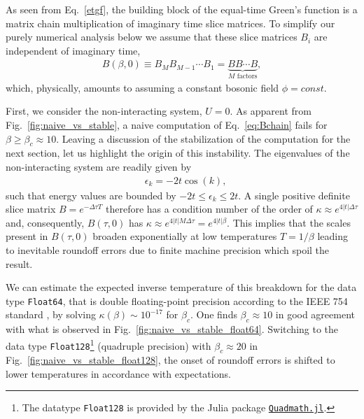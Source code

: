\documentclass[submission, Phys]{SciPost}
\begin{document}
As seen from Eq.~\eqref{etgf}, the building block of the equal-time Green's function is a matrix chain multiplication of imaginary time slice matrices. To simplify our purely numerical analysis below we assume that these slice matrices $B_i$ are independent of imaginary time,
\begin{align}
	B(\beta, 0) \equiv B_M B_{M-1} \cdots B_1 = \underbrace{B B \cdots B}_{M \textrm{ factors}}, \label{eq:Bchain}
\end{align}
which, physically, amounts to assuming a constant bosonic field $\phi = \textit{const}$.

First, we consider the non-interacting system, $U=0$. As apparent from Fig.~\ref{fig:naive_vs_stable}, a naive computation of Eq.~\ref{eq:Bchain} fails for $\beta \geq \beta_c \approx 10$. Leaving a discussion of the stabilization of the computation for the next section, let us highlight the origin of this instability. The eigenvalues of the non-interacting system are readily given by
\begin{align}
	&\epsilon_k = -2t\cos(k),
\end{align}
such that energy values are bounded by $-2t \leq \epsilon_k \leq 2t$. A single positive definite slice matrix $B = e^{-\Delta \tau T}$ therefore has a condition number of the order of $\kappa \approx e^{4|t|\Delta \tau}$ and, consequently, $B(\tau, 0)$ has $\kappa \approx e^{4|t|M\Delta \tau} = e^{4|t|\beta}$. This implies that the scales present in $B(\tau, 0)$ broaden exponentially at low temperatures $T=1/\beta$ leading to inevitable roundoff errors due to finite machine precision which spoil the result.

We can estimate the expected inverse temperature of this breakdown for the data type \texttt{Float64}, that is double floating-point precision according to the IEEE 754 standard \cite{Goldberg1991}, by solving $\kappa(\beta) \sim 10^{-17}$ for $\beta_c$. One finds $\beta_c \approx 10$ in good agreement with what is observed in Fig.~\ref{fig:naive_vs_stable_float64}. Switching to the data type \texttt{Float128}\footnote{The datatype \texttt{Float128} is provided by the Julia package \href{https://github.com/JuliaMath/Quadmath.jl}{\texttt{Quadmath.jl}}.} (quadruple precision) with $\beta_c \approx 20$ in Fig.~\ref{fig:naive_vs_stable_float128}, the onset of roundoff errors is shifted to lower temperatures in accordance with expectations.
\end{document}
